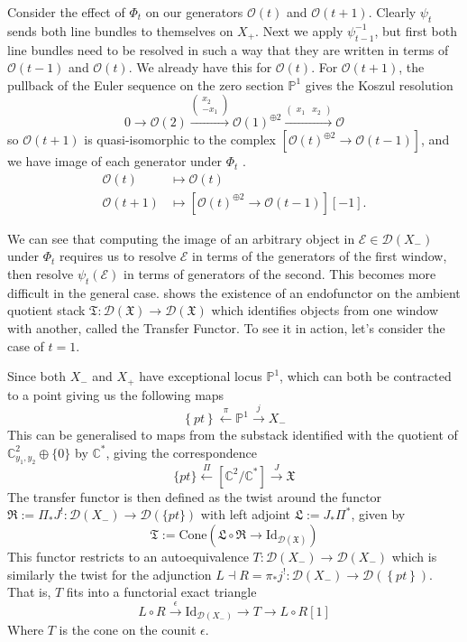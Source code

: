 Consider the effect of $\Phi_t$ on our generators $\mathcal{O}(t)$ and $\mathcal{O}(t+1)$. Clearly $\psi_t$ sends both line bundles to themselves on $X_{+}$. Next we apply $\psi_{t-1}^{-1}$, but first both line bundles need to be resolved in such a way that they are written in terms of $\mathcal{O}(t-1)$ and $\mathcal{O}(t)$. We already have this for $\mathcal{O}(t)$. For $\mathcal{O}(t+1)$, the pullback of the Euler sequence on the zero section $\mathbb{P}^1$ gives the Koszul resolution $$
 0\to \mathcal{O}(2)\xrightarrow{\begin{pmatrix}x_2\\-x_{1}\end{pmatrix}}\mathcal{O}(1)^{\oplus 2}\xrightarrow{\begin{pmatrix}x_{1}&x_2\end{pmatrix}} \mathcal{O}
$$so $\mathcal{O}(t+1)$ is quasi-isomorphic to the complex $\left[ \mathcal{O}(t)^{\oplus{2}}\to \mathcal{O}(t-1) \right]$, and we have image of each generator under $\Phi_t$ . 
\begin{align*}
\mathcal{O}(t) &\mapsto \mathcal{O}(t)\\
\mathcal{\mathcal{O}}(t+1)&\mapsto\left[ \mathcal{O}(t)^{\oplus 2}\to \mathcal{O}(t-1) \right][-1] .
\end{align*}

We can see that computing the image of an arbitrary object in $\mathcal{E} \in \mathcal{D}(X_-)$ under $\Phi_t$ requires us to resolve $\mathcal{E}$ in terms of the generators of the first window, then resolve $\psi_{t}(\mathcal{E})$ in terms of generators of the second. This becomes more difficult in the general case.  \cite{donovan_window_2014} shows the existence of an endofunctor on the ambient quotient stack $\mathfrak{T}: \mathcal{D}(\mathfrak{X})\to \mathcal{D}(\mathfrak{X})$ which identifies objects from one window with another, called the Transfer Functor. To see it in action, let's consider the case of $t = 1$.

Since both $X_-$ and $X_+$ have exceptional locus $\mathbb{P}^1$, which can both be contracted to a point giving us the following maps $$
\left\{ pt \right\} \xleftarrow{\pi} \mathbb{P}^{1}\xrightarrow{j} X_{-}
$$
This can be generalised to maps from the substack identified with the quotient of $\mathbb{C}^{2}_{y_{1}, y_{2}} \oplus \{ 0 \}$ by $\mathbb{C}^*$, giving the correspondence $$
\{ pt \}\xleftarrow{\Pi}[\mathbb{C}^{2}/\mathbb{C}^*] \xrightarrow{J} \mathfrak{X}
$$
The transfer functor is then defined as the twist around the functor $\mathfrak{R}:= \Pi_{*}J^{!}: \mathcal{D}(X_{-})\to \mathcal{D}(\{ pt \})$  with left adjoint $\mathfrak{L}:= J_{*}\Pi^{*}$, given by $$
\mathfrak{T}:= \mathrm{Cone}\left(\mathfrak{L}\circ \mathfrak{R} \to \mathrm{Id}_{\mathcal{D}(\mathfrak{X})} \right) 
$$
This functor restricts to an autoequivalence $T: \mathcal{D}(X_{-})\to \mathcal{D}(X_-)$ which is similarly the twist for the adjunction $L\dashv R= \pi_{*}j^{!} : \mathcal{D}(X_{-})\to \mathcal{D}(\left\{ pt \right\})$. That is, $T$ fits into a functorial exact triangle $$
L\circ R \xrightarrow{\epsilon} \mathrm{Id}_{\mathcal{D}(X_{-})} \to T\to L\circ R[1]
$$Where $T$ is the cone on the counit $\epsilon$. 


